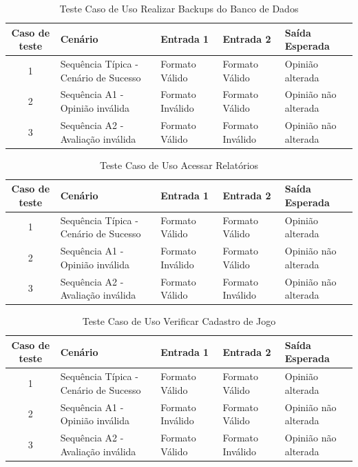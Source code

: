 \documentclass[a4paper,11pt]{article}
\begin{document}
	\begin{center}
	\begin{table}[H]
		\begin{tabularx}{\textwidth}{|c|X|X|X|X|} \hline
			\textbf{Caso de teste} & \textbf{Cenário} & \textbf{Entrada 1} & \textbf{Entrada 2} & \textbf{Saída Esperada} \\
			\hline
			1 & Sequência Típica - Cenário de Sucesso & Formato Válido & Formato Válido & Opinião alterada\\ \hline
			2 & Sequência A1 - Opinião inválida & Formato Inválido & Formato Válido & Opinião não alterada\\ \hline
			3 & Sequência A2 - Avaliação inválida & Formato Válido & Formato Inválido & Opinião não alterada\\ \hline
			
		\end{tabularx}
		\caption{Teste Caso de Uso Realizar Backups do Banco de Dados}
	\end{table}
	\end{center}
	
	\begin{center}
	\begin{table}[H]
		\begin{tabularx}{\textwidth}{|c|X|X|X|X|} \hline
			\textbf{Caso de teste} & \textbf{Cenário} & \textbf{Entrada 1} & \textbf{Entrada 2} & \textbf{Saída Esperada} \\
			\hline
			1 & Sequência Típica - Cenário de Sucesso & Formato Válido & Formato Válido & Opinião alterada\\ \hline
			2 & Sequência A1 - Opinião inválida & Formato Inválido & Formato Válido & Opinião não alterada\\ \hline
			3 & Sequência A2 - Avaliação inválida & Formato Válido & Formato Inválido & Opinião não alterada\\ \hline
			
		\end{tabularx}
		\caption{Teste Caso de Uso Acessar Relatórios}
	\end{table}
	\end{center}
	
	\begin{center}
	\begin{table}[H]
		\begin{tabularx}{\textwidth}{|c|X|X|X|X|} \hline
			\textbf{Caso de teste} & \textbf{Cenário} & \textbf{Entrada 1} & \textbf{Entrada 2} & \textbf{Saída Esperada} \\
			\hline
			1 & Sequência Típica - Cenário de Sucesso & Formato Válido & Formato Válido & Opinião alterada\\ \hline
			2 & Sequência A1 - Opinião inválida & Formato Inválido & Formato Válido & Opinião não alterada\\ \hline
			3 & Sequência A2 - Avaliação inválida & Formato Válido & Formato Inválido & Opinião não alterada\\ \hline
			
		\end{tabularx}
		\caption{Teste Caso de Uso Verificar Cadastro de Jogo}
	\end{table}
	\end{center}
	
\end{document}
